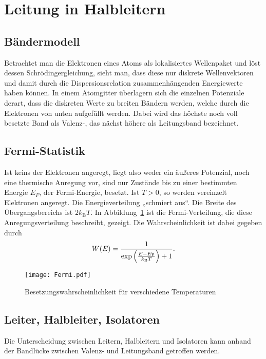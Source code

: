 \section{Leitung in Halbleitern}

\subsection{Bändermodell}

Betrachtet man die Elektronen eines Atoms als lokalisiertes Wellenpaket und
löst dessen Schrödingergleichung, sieht man, dass diese nur diskrete
Wellenvektoren und damit durch die Dispersionsrelation zusammenhängenden
Energiewerte haben können. In einem Atomgitter überlagern sich die einzelnen
Potenziale derart, dass die diskreten Werte zu breiten Bändern werden, welche
durch die Elektronen von unten aufgefüllt werden. Dabei wird das höchste noch
voll besetzte Band als Valenz-, das nächst höhere als Leitungsband bezeichnet.

\subsection{Fermi-Statistik}

Ist keins der Elektronen angeregt, liegt also weder ein äußeres Potenzial, noch
eine thermische Anregung vor, sind nur Zustände bis zu einer bestimmten Energie
$E_F$, der Fermi-Energie, besetzt. Ist $T>0$, so werden vereinzelt Elektronen
angeregt. Die Energieverteilung „schmiert aus“. Die Breite des
Übergangsbereichs ist $2k_\text{B}T$. In Abbildung~\ref{fig:Fermi} ist die
Fermi-Verteilung, die diese Anregungsverteilung beschreibt, gezeigt. Die Wahrscheinlichkeit ist dabei gegeben durch
\[
    W(E) = \frac{1}{\exp\del{\frac{E-E_\text{F}}{k_\text{B}T}}+1}.
\]

\begin{figure}
    \centering
    \texttt{[image: Fermi.pdf]}
    \caption{%
        Besetzungswahrscheinlichkeit für verschiedene Temperaturen
    }
    \label{fig:Fermi}
\end{figure}

\subsection{Leiter, Halbleiter, Isolatoren}

Die Unterscheidung zwischen Leitern, Halbleitern und Isolatoren kann anhand der
Bandlücke zwischen Valenz- und Leitungsband getroffen werden.


